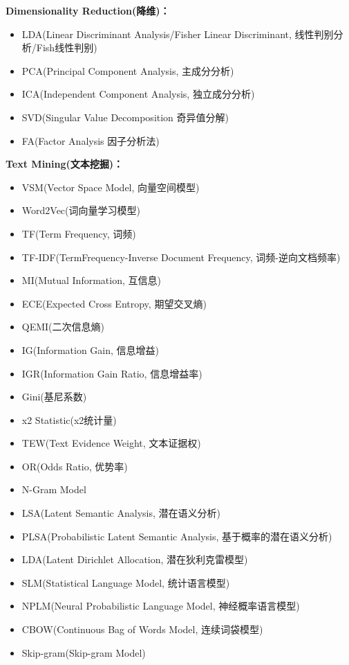 \documentclass[10pt,a4paper]{ctexbook}
\begin{document}
\textbf{Dimensionality Reduction(降维)：}
\begin{itemize}
\item LDA(Linear Discriminant Analysis/Fisher Linear Discriminant, 线性判别分析/Fish线性判别)
\item PCA(Principal Component Analysis, 主成分分析)
\item ICA(Independent Component Analysis, 独立成分分析)
\item SVD(Singular Value Decomposition 奇异值分解)
\item FA(Factor Analysis 因子分析法)
\end{itemize}

\textbf{Text Mining(文本挖掘)：}
\begin{itemize}
\item VSM(Vector Space Model, 向量空间模型)
\item Word2Vec(词向量学习模型)
\item TF(Term Frequency, 词频)
\item TF-IDF(TermFrequency-Inverse Document Frequency, 词频-逆向文档频率)
\item MI(Mutual Information, 互信息)
\item ECE(Expected Cross Entropy, 期望交叉熵)
\item QEMI(二次信息熵)
\item IG(Information Gain, 信息增益)
\item IGR(Information Gain Ratio, 信息增益率)
\item Gini(基尼系数)
\item x2 Statistic(x2统计量)
\item TEW(Text Evidence Weight, 文本证据权)
\item OR(Odds Ratio, 优势率)
\item N-Gram Model
\item LSA(Latent Semantic Analysis, 潜在语义分析)
\item PLSA(Probabilistic Latent Semantic Analysis, 基于概率的潜在语义分析)
\item LDA(Latent Dirichlet Allocation, 潜在狄利克雷模型)
\item SLM(Statistical Language Model, 统计语言模型)
\item NPLM(Neural Probabilistic Language Model, 神经概率语言模型)
\item CBOW(Continuous Bag of Words Model, 连续词袋模型)
\item Skip-gram(Skip-gram Model)
\end{itemize}
\end{document}
